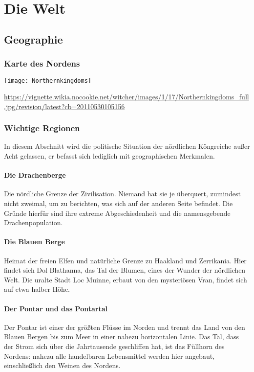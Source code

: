 \documentclass[parskip=full,11pt,%
footheight=38pt]{scrreport}
\begin{document}
\iffalse
	\chapter{Die Welt}

	\section{Geographie}
	\subsection{Karte des Nordens}
	\texttt{[image: Northernkingdoms]}
	\begin{tiny}\url{https://vignette.wikia.nocookie.net/witcher/images/1/17/Northernkingdoms_full.jpg/revision/latest?cb=20110530105156}\end{tiny}
	\subsection{Wichtige Regionen}
	In diesem Abschnitt wird die politische Situation der nördlichen Köngreiche außer Acht gelassen, er befasst sich lediglich mit geographischen Merkmalen.
	\subsubsection{Die Drachenberge}
	Die nördliche Grenze der Zivilisation. Niemand hat sie je überquert, zumindest nicht zweimal, um zu berichten, was sich auf der anderen Seite befindet. Die Gründe hierfür sind ihre extreme Abgeschiedenheit und die namensgebende Drachenpopulation.

	\subsubsection{Die Blauen Berge}
	Heimat der freien Elfen und natürliche Grenze zu Haakland und Zerrikania. Hier findet sich Dol Blathanna, das Tal der Blumen, eines der Wunder der nördlichen Welt. Die uralte Stadt Loc Muinne, erbaut von den mysteriösen Vran, findet sich auf etwa halber Höhe.

	\subsubsection{Der Pontar und das Pontartal}
	Der Pontar ist einer der größten Flüsse im Norden und trennt das Land von den Blauen Bergen bis zum Meer in einer nahezu horizontalen Linie. Das Tal, dass der Strom sich über die Jahrtausende geschliffen hat, ist das Füllhorn des Nordens: nahezu alle handelbaren Lebensmittel werden hier angebaut, einschließlich den Weinen des Nordens.
\end{document}
